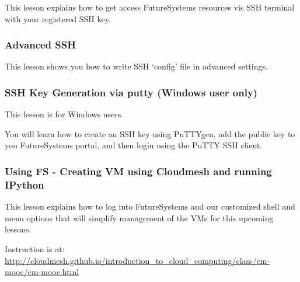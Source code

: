 This lesson explains how to get access FutureSystems resources vis SSH
terminal with your registered SSH key.


\subsubsection{Advanced SSH}

This lesson shows you how to write SSH `config' file in advanced
settings.


\subsubsection{SSH Key Generation via putty (Windows user only)}

This lesson is for Windows users.

You will learn how to create an SSH key using PuTTYgen, add the public
key to you FutureSystems portal, and then login using the PuTTY SSH
client.


\subsubsection{Using FS - Creating VM using Cloudmesh and running IPython}

This lesson explains how to log into FutureSystems and our customized
shell and menu options that will simplify management of the VMs for this
upcoming lessons.

Instruction is at:
\url{http://cloudmesh.github.io/introduction_to_cloud_computing/class/cm-mooc/cm-mooc.html}

